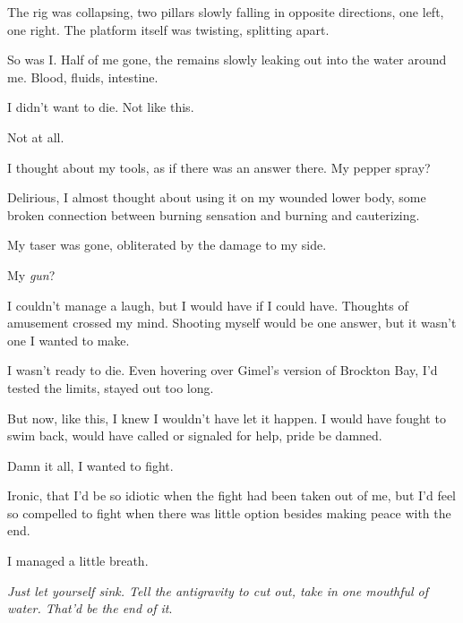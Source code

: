 The rig was collapsing, two pillars slowly falling in opposite directions, one left, one right.  The platform itself was twisting, splitting apart.



So was I.  Half of me gone, the remains slowly leaking out into the water around me.  Blood, fluids, intestine.



I didn't want to die.  Not like this.



Not at all.



I thought about my tools, as if there was an answer there.  My pepper spray?



Delirious, I almost thought about using it on my wounded lower body, some broken connection between burning sensation and burning and cauterizing.



My taser was gone, obliterated by the damage to my side.



My \emph{gun}?



I couldn't manage a laugh, but I would have if I could have.  Thoughts of amusement crossed my mind.  Shooting myself would be one answer, but it wasn't one I wanted to make.



I wasn't ready to die.  Even hovering over Gimel's version of Brockton Bay, I'd tested the limits, stayed out too long.



But now, like this, I knew I wouldn't have let it happen.  I would have fought to swim back, would have called or signaled for help, pride be damned.



Damn it all, I wanted to fight.



Ironic, that I'd be so idiotic when the fight had been taken out of me, but I'd feel so compelled to fight when there was little option besides making peace with the end.



I managed a little breath.



\emph{Just let yourself sink.  Tell the antigravity to cut out, take in one mouthful of water.  That'd be the end of it}.



